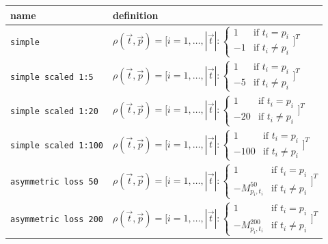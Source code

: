\documentclass[twoside,11pt]{article}
\begin{document}
\begin{longtabu}{p{3cm}|X}
    name &definition \\ \hline
    \texttt{simple}
    &$\rho(\vec{t}, \vec{p}) = \Bigg[
      i=1,\dots,|\vec{t}|:
      \begin{cases}
        1  &\text{if } t_i = p_i \\
        -1 &\text{if } t_i \neq p_i
      \end{cases} \Bigg]^T$\\

    \texttt{simple scaled 1:5}
    &$\rho(\vec{t}, \vec{p}) = \Bigg[
      i=1,\dots,|\vec{t}|:
      \begin{cases}
        1  &\text{if } t_i = p_i \\
        -5 &\text{if } t_i \neq p_i
      \end{cases} \Bigg]^T$\\

    \texttt{simple scaled 1:20}
    &$\rho(\vec{t}, \vec{p}) = \Bigg[
      i=1,\dots,|\vec{t}|:
      \begin{cases}
        1  &\text{if } t_i = p_i \\
        -20 &\text{if } t_i \neq p_i
      \end{cases} \Bigg]^T$\\

    \texttt{simple scaled 1:100}
    &$\rho(\vec{t}, \vec{p}) = \Bigg[
      i=1,\dots,|\vec{t}|:
      \begin{cases}
        1  &\text{if } t_i = p_i \\
        -100 &\text{if } t_i \neq p_i
      \end{cases} \Bigg]^T$\\

    \texttt{asymmetric loss 50}
    &$\rho(\vec{t}, \vec{p}) = \Bigg[
      i=1,\dots,|\vec{t}|:
      \begin{cases}
        1  &\text{if } t_i = p_i \\
        -M^{50}_{p_i,t_i} &\text{if } t_i \neq p_i
      \end{cases} \Bigg]^T$\\

    \texttt{asymmetric loss 200}
    &$\rho(\vec{t}, \vec{p}) = \Bigg[
      i=1,\dots,|\vec{t}|:
      \begin{cases}
        1  &\text{if } t_i = p_i \\
        -M^{200}_{p_i,t_i} &\text{if } t_i \neq p_i
      \end{cases} \Bigg]^T$\\


\end{longtabu}
\end{document}
